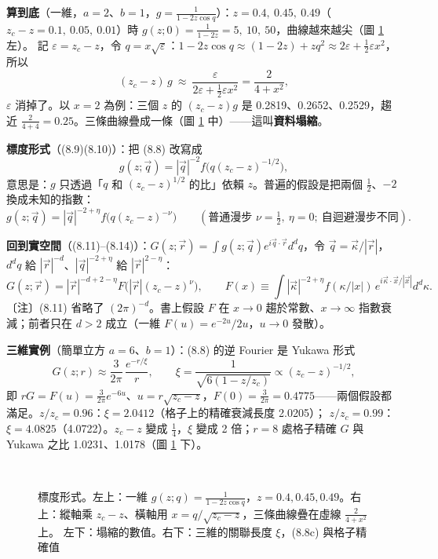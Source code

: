 \textbf{算到底}（一維，$a=2$、$b=1$，$g=\frac1{1-2z\cos q}$）：$z=0.4,\ 0.45,\ 0.49$（$z_c-z=0.1,\ 0.05,\ 0.01$）時 $g(z;0)=\frac1{1-2z}=5,\ 10,\ 50$，曲線越來越尖（圖 \ref{eight-fig-collapse} 左）。
記 $\varepsilon=z_c-z$，令 $q=x\sqrt\varepsilon$：$1-2z\cos q\approx(1-2z)+zq^2\approx2\varepsilon+\frac12\varepsilon x^2$，所以
\[(z_c-z)\,g\ \approx\ \frac{\varepsilon}{2\varepsilon+\frac12\varepsilon x^2}=\frac2{4+x^2},\]
$\varepsilon$ 消掉了。以 $x=2$ 為例：三個 $z$ 的 $(z_c-z)g$ 是 0.2819、0.2652、0.2529，趨近 $\frac2{4+4}=0.25$。三條曲線疊成一條（圖 \ref{eight-fig-collapse} 中）——這叫\textbf{資料塌縮}。

\textbf{標度形式}（(8.9)(8.10)）：把 (8.8) 改寫成
\[g(z;\vec q)=|\vec q|^{-2}f\big(q(z_c-z)^{-1/2}\big),\tag{8.9}\]
意思是：$g$ 只透過「$q$ 和 $(z_c-z)^{1/2}$ 的比」依賴 $z$。普遍的假設是把兩個 $\frac12$、$-2$ 換成未知的指數：
\[g(z;\vec q)=|\vec q|^{-2+\eta}f\big(q(z_c-z)^{-\nu}\big)\qquad(\text{普通漫步 }\nu=\tfrac12,\ \eta=0;\ \text{自迴避漫步不同}).\tag{8.10}\]

\textbf{回到實空間}（(8.11)--(8.14)）：$G(z;\vec r)=\int g(z;\vec q)e^{i\vec q\cdot\vec r}d^dq$，令 $\vec q=\vec\kappa/|\vec r|$，$d^dq$ 給 $|\vec r|^{-d}$、$|\vec q|^{-2+\eta}$ 給 $|\vec r|^{2-\eta}$：
\[G(z;\vec r)=|\vec r|^{-d+2-\eta}F\big(|\vec r|(z_c-z)^\nu\big),\qquad F(x)\equiv\int|\vec\kappa|^{-2+\eta}f(\kappa/|x|)\,e^{i\vec\kappa\cdot\vec x/|\vec x|}d^d\kappa .\tag{8.13, 8.14}\]
〔注〕(8.11) 省略了 $(2\pi)^{-d}$。書上假設 $F$ 在 $x\to0$ 趨於常數、$x\to\infty$ 指數衰減；前者只在 $d>2$ 成立（一維 $F(u)=e^{-2u}/2u$，$u\to0$ 發散）。

\textbf{三維實例}（簡單立方 $a=6$、$b=1$）：(8.8) 的逆 Fourier 是 Yukawa 形式
\[G(z;r)\approx\frac3{2\pi}\,\frac{e^{-r/\xi}}r,\qquad\xi=\frac1{\sqrt{6(1-z/z_c)}}\propto(z_c-z)^{-1/2},\]
即 $rG=F(u)=\frac3{2\pi}e^{-6u}$、$u=r\sqrt{z_c-z}$，$F(0)=\frac3{2\pi}=0.4775$——兩個假設都滿足。$z/z_c=0.96$：$\xi=2.0412$（格子上的精確衰減長度 2.0205）；
$z/z_c=0.99$：$\xi=4.0825$（4.0722）。$z_c-z$ 變成 $\frac14$，$\xi$ 變成 2 倍；$r=8$ 處格子精確 $G$ 與 Yukawa 之比 1.0231、1.0178（圖 \ref{eight-fig-collapse} 下）。

\begin{figure}[htbp]
\centering
\EightFigRawG\hfill\EightFigCollapse\\[6pt]
{\footnotesize\setlength{\tabcolsep}{3.5pt}\EightTabCollapse\hfill\EightTabXi}
\caption{標度形式。左上：一維 $g(z;q)=\frac1{1-2z\cos q}$，$z=0.4,0.45,0.49$。右上：縱軸乘 $z_c-z$、橫軸用 $x=q/\sqrt{z_c-z}$，三條曲線疊在虛線 $\frac2{4+x^2}$ 上。
左下：塌縮的數值。右下：三維的關聯長度 $\xi$，(8.8c) 與格子精確值}\label{eight-fig-collapse}
\end{figure}

